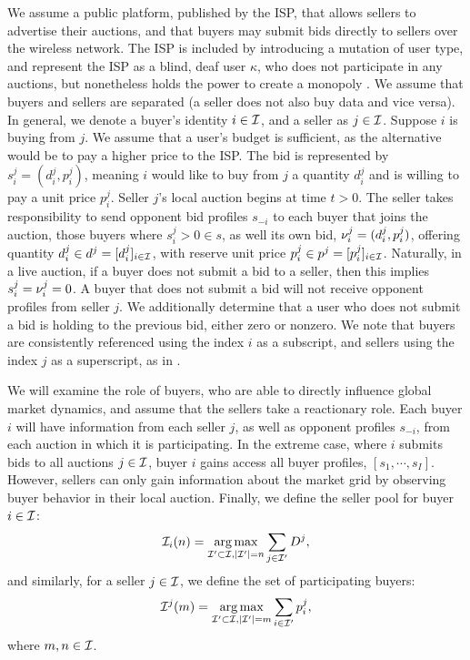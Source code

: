 We assume a public platform, published by the ISP, that allows sellers to advertise their
auctions, and that buyers may submit bids directly to sellers over the wireless
network. 
The ISP is included
by introducing a mutation of user type, and represent
the ISP as a blind, deaf user $\kappa$, who does not participate
in any auctions, but nonetheless holds the power to create a monopoly
.
We assume that buyers and sellers are
separated (a seller does not also buy data and vice versa). 
In general, we denote a buyer's identity $i \in \mathcal{I}$, and a seller as
$j\in\mathcal{I}$.
Suppose $i$ is buying from $j$. We assume that a user's budget is 
sufficient, as the alternative would be to pay a higher price to the ISP. The bid is represented by $s_i^j = (d_i^j, p_i^j)$, 
meaning $i$ would like to buy from $j$ a quantity $d^j_i$ and is willing to pay
a unit price $p^j_i$. 
Seller $j$'s local auction begins at time $t>0$. The seller takes responsibility
to send opponent bid profiles $s_{-i}$ to each buyer that joins the auction,
those buyers where $s_i^j > 0 \in s$, as well its own bid, $\nu_i^j = (d_i^j,
p_i^j)$, offering quantity $d_i^j \in d^j = [d_i^j]_{i\in\mathcal{I}}$, 
with reserve unit price $p_i^j \in p^j = [p_i^j]_{i\in\mathcal{I}}$. 
Naturally, in a live auction, if a buyer does
not submit a bid to a seller, then this implies $s_i^j=\nu_i^j = 0$. A buyer that does not submit a bid will not receive opponent profiles from seller
$j$. We additionally determine that a user who does not submit a bid is holding
to the previous bid, either zero or nonzero. We note that buyers are
consistently referenced using the index $i$ as a subscript, and sellers using
the index $j$ as a superscript, as in \cite{semret}.

We will examine the role of buyers, who are able to directly
influence global market dynamics, and assume that the sellers take a reactionary role.
Each buyer $i$ will have information from each seller $j$, as well as opponent
profiles $s_{-i}$, from each auction in which it is participating.
In the extreme case, where $i$ submits bids to all auctions $j\in\mathcal{I}$, buyer
$i$ gains access all buyer profiles, $[s_1, \cdots, s_I]$. However, 
sellers can only gain information about the market grid by observing buyer
behavior in their local auction.
Finally, we define the seller pool for buyer $i\in\mathcal{I}$: 
$$
    \mathcal{I}_i(n) =\operatorname*{arg\,max}_{\mathcal{I}' \subset \mathcal{I}, \vert\mathcal{I}'\vert =
n}\sum_{j\in\mathcal{I}'} D^j,
$$
and similarly, for a seller $j\in\mathcal{I}$, we define the set of participating buyers:
$$
    \mathcal{I}^j(m) =\operatorname*{arg\,max}_{{\mathcal{I}}' \subset \mathcal{I}, \vert{\mathcal{I}}'\vert =
m}\sum_{i\in{\mathcal{I}}'} p_i^j,
$$
where $m, n\in\mathcal{I}$.

